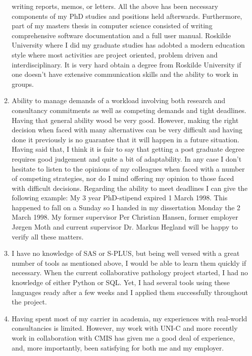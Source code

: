 \documentclass[12pt,a4paper]{article}
\begin{document}
\begin{enumerate}
  writing reports, memos, or letters.
  All the above has been necessary components of my PhD studies
  and positions held afterwards.
  Furthermore, part of my masters thesis in computer science 
  consisted of writing comprehensive software documentation and
  a full user manual. 
  Roskilde University where I did my graduate studies has adobted 
  a modern education style where most activities are project 
  oriented, problem driven and interdisciplinary. 
  It is very hard obtain a degree from Roskilde University if 
  one doesn't have extensive communication skills and the ability to 
  work in groups. 
  \item Ability to manage demands of a workload involving 
  both research and consultancy commitments as well as
  competing demands and tight deadlines. Having that general 
  ability wood be very good. 
  However, making the right decision when faced with 
  many alternatives can be very difficult and having done it 
  previously is no guarantee
  that it will happen in a future situation. Having said that,
  I think it is fair to say that getting a post graduate degree
  requires good judgement and quite a bit of adaptability.
  In any case I don't hesitate to listen to the opinions of
  my colleagues when faced with a number of competing strategies, 
  nor do I mind offering my opinion to those faced with difficult decisions.
  Regarding the ability to meet deadlines I can give the following example:   
  My 3 year PhD-stipend expired 1 March 1998. This happened to fall
  on a Sunday so I handed in my dissertation Monday the 2 March 1998.
  My former supervisor Per Christian Hansen, 
  former employer J{\o}rgen Moth and current supervisor
  Dr. Markus Hegland will be happy to verify all these matters.
  \item I have no knowledge of SAS or S-PLUS, but being well versed with 
  a great number of tools as mentioned above, I would be able to
  learn them quickly if necessary.
  When the current collaborative pathology project started, 
  I had no knowledge of either Python or SQL. 
  Yet, I had several tools using these languages ready after a few weeks 
  and I applied them successfully throughout the project.
  \item Having spent most of my carrier in academia, my experiences with
  real-world consultancies is limited. However, my work with UNI-C
  and more recently work in collaboration with CMIS has given me a good deal
  of experience, and, more importantly, been satisfying for both me and 
  my employer.
\end{enumerate}   
\end{document}
